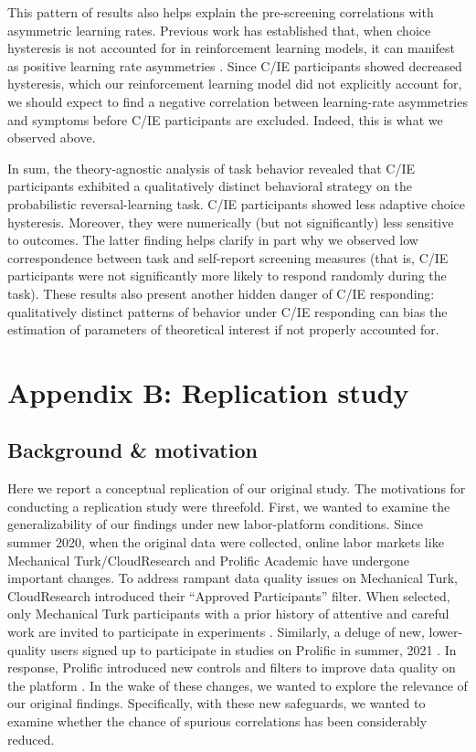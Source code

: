 \documentclass[a4paper,notitlepage,12pt]{article}
\begin{document}
This pattern of results also helps explain the pre-screening correlations with asymmetric learning rates. Previous work has established that, when choice hysteresis is not accounted for in reinforcement learning models, it can manifest as positive learning rate asymmetries \cite{Katahira2018-ke, sugawara2021dissociation}. Since C/IE participants showed decreased hysteresis, which our reinforcement learning model did not explicitly account for, we should expect to find a negative correlation between learning-rate asymmetries and symptoms before C/IE participants are excluded. Indeed, this is what we observed above. 

In sum, the theory-agnostic analysis of task behavior revealed that C/IE participants exhibited a qualitatively distinct behavioral strategy on the probabilistic reversal-learning task. C/IE participants showed less adaptive choice hysteresis. Moreover, they were numerically (but not significantly) less sensitive to outcomes. The latter finding helps clarify in part why we observed low correspondence between task and self-report screening measures (that is, C/IE participants were not significantly more likely to respond randomly during the task). These results also present another hidden danger of C/IE responding: qualitatively distinct patterns of behavior under C/IE responding can bias the estimation of parameters of theoretical interest if not properly accounted for. 

\break
\section*{Appendix B: Replication study}

\subsection*{Background \& motivation}

Here we report a conceptual replication of our original study. The motivations for conducting a replication study were threefold. First, we wanted to examine the generalizability of our findings under new labor-platform conditions. Since summer 2020, when the original data were collected, online labor markets like Mechanical Turk/CloudResearch and Prolific Academic have undergone important changes. To address rampant data quality issues on Mechanical Turk, CloudResearch introduced their ``Approved Participants'' filter. When selected, only Mechanical Turk participants with a prior history of attentive and careful work are invited to participate in experiments \cite{cloudresearch_2020-2, hauser2021evaluating}. Similarly, a deluge of new, lower-quality users signed up to participate in studies on Prolific in summer, 2021 \cite{Letzter2021-bw}. In response, Prolific introduced new controls and filters to improve data quality on the platform \cite{prolific_2021}. In the wake of these changes, we wanted to explore the relevance of our original findings. Specifically, with these new safeguards, we wanted to examine whether the chance of spurious correlations has been considerably reduced. 
\end{document}
